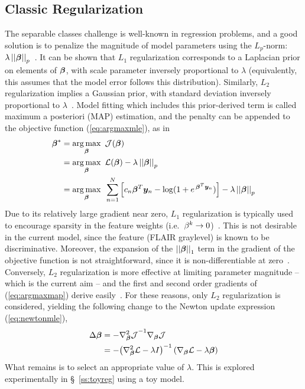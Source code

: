\subsection{Classic Regularization}\label{ss:vlr-reg-lambda}
The separable classes challenge is well-known in regression problems,
and a good solution is to penalize the magnitude of model parameters using the $L_p$-norm:
$\lambda\left|\left|\bm{\beta}\right|\right|_p$~\cite{Zou2005}.
It can be shown that $L_1$ regularization corresponds to a Laplacian prior on elements of $\bm{\beta}$,
with scale parameter inversely proportional to $\lambda$
(equivalently, this assumes that the model error follows this distribution).
Similarly, $L_2$ regularization implies a Gaussian prior,
with standard deviation inversely proportional to $\lambda$~\cite{Zou2005}.
Model fitting which includes this prior-derived term is called
maximum a posteriori (MAP) estimation,
and the penalty can be appended to the objective function (\ref{eq:argmaxmle}), as in
\begin{align}
  \bb^* &= \underset{\bb}{\arg\max}\en\J(\bb) \nonumber\\
        &= \underset{\bb}{\arg\max}\en\L(\bb) - \lambda\norm{\bb}_p \nonumber\\
        &= \underset{\bb}{\arg\max}\en\sum_{n=1}^{N}
           \Big[ c_n \bb^T\by_n - \log (1+e^{\et\bb^T\by_n}) \Big] - \lambda\norm{\bb}_p%
  \label{eq:argmaxmap}
\end{align}
Due to its relatively large gradient near zero,
$L_1$ regularization is typically used to encourage sparsity in the feature weights
(i.e.\ $\beta^k\rightarrow0$)~\cite{Tibshirani1996}.
This is not desirable in the current model,
since the feature (FLAIR graylevel) is known to be discriminative.
Moreover, the expansion of the $\left|\left|\bm{\beta}\right|\right|_1$ term
in the gradient of the objective function is not straightforward,
since it is non-differentiable at zero~\cite{Tibshirani1996,Lee2006}.
Conversely, $L_2$ regularization is more effective at limiting parameter magnitude
-- which is the current aim --
and the first and second order gradients of (\ref{eq:argmaxmap}) derive easily~\cite{Minka2003}.
For these reasons, only $L_2$ regularization is considered,
yielding the following change to the Newton update expression (\ref{eq:newtonmle}),
\begin{align}
  \Delta\bb &=-{\nabla^2_{\bb}\J}^{-1}\nabla_{\bb}\J \nonumber\\
            &=-{\left(\nabla^2_{\bb}\L-\lambda I\right)}^{-1}\left(\nabla_{\bb}\L-\lambda\bb\right)%
  \label{eq:newtonmap}
\end{align}
What remains is to select an appropriate value of $\lambda$.
This is explored experimentally in \S~\ref{ss:toyreg} using a toy model.
